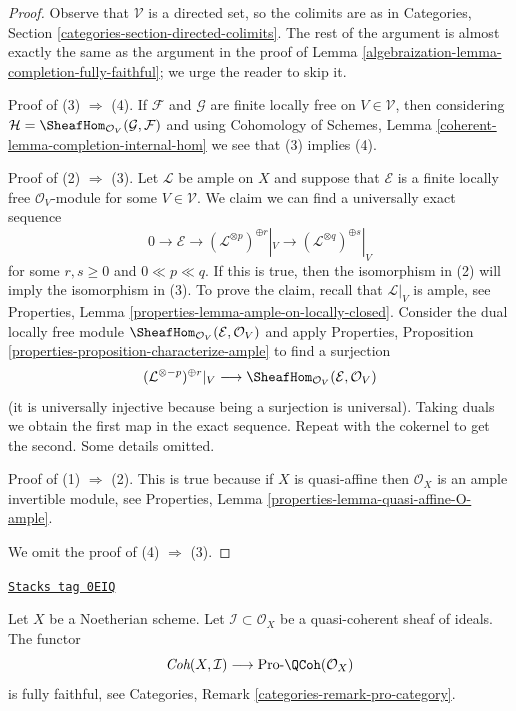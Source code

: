 \begin{proof}

Observe that $\mathcal{V}$ is a directed set, so the colimits are
as in Categories, Section \ref{categories-section-directed-colimits}.
The rest of the argument is almost exactly the same as the argument
in the proof of Lemma \ref{algebraization-lemma-completion-fully-faithful}; we urge
the reader to skip it.

\medskip\noindent
Proof of (3) $\Rightarrow$ (4). If $\mathcal{F}$ and $\mathcal{G}$
are finite locally free on $V \in \mathcal{V}$, then considering
$\mathcal{H} = \SheafHom_{\mathcal{O}_V}(\mathcal{G}, \mathcal{F})$
and using Cohomology of Schemes, Lemma
\ref{coherent-lemma-completion-internal-hom}
we see that (3) implies (4).

\medskip\noindent
Proof of (2) $\Rightarrow$ (3). Let $\mathcal{L}$ be ample
on $X$ and suppose that $\mathcal{E}$ is a
finite locally free $\mathcal{O}_V$-module
for some $V \in \mathcal{V}$.
We claim we can find a universally exact sequence
$$
0 \to \mathcal{E} \to
(\mathcal{L}^{\otimes p})^{\oplus r}|_{V} \to
(\mathcal{L}^{\otimes q})^{\oplus s}|_{V}
$$
for some $r, s \geq 0$ and $0 \ll p \ll q$. If this is true, then
the isomorphism in (2) will imply the isomorphism in (3).
To prove the claim, recall that $\mathcal{L}|_V$ is ample, see
Properties, Lemma \ref{properties-lemma-ample-on-locally-closed}.
Consider the dual locally free module
$\SheafHom_{\mathcal{O}_V}(\mathcal{E}, \mathcal{O}_V)$
and apply
Properties, Proposition \ref{properties-proposition-characterize-ample}
to find a surjection
$$
(\mathcal{L}^{\otimes -p})^{\oplus r}|_V \longrightarrow
\SheafHom_{\mathcal{O}_V}(\mathcal{E}, \mathcal{O}_V)
$$
(it is universally injective because being a surjection is universal).
Taking duals we obtain the first map in the exact sequence.
Repeat with the cokernel to get the second. Some details omitted.

\medskip\noindent
Proof of (1) $\Rightarrow$ (2). This is true because if $X$ is quasi-affine
then $\mathcal{O}_X$ is an ample invertible module, see
Properties, Lemma \ref{properties-lemma-quasi-affine-O-ample}.

\medskip\noindent
We omit the proof of (4) $\Rightarrow$ (3).
\end{proof}

\begin{lemma}
\label{algebraization-lemma-recognize-formal-coherent-modules}
\href{https://stacks.math.columbia.edu/tag/0EIQ}{\texttt{Stacks tag 0EIQ}}

Let $X$ be a Noetherian scheme. Let $\mathcal{I} \subset \mathcal{O}_X$
be a quasi-coherent sheaf of ideals. The functor
$$
\textit{Coh}(X, \mathcal{I}) \longrightarrow \text{Pro-}\QCoh(\mathcal{O}_X)
$$
is fully faithful, see Categories, Remark \ref{categories-remark-pro-category}.
\end{lemma}

